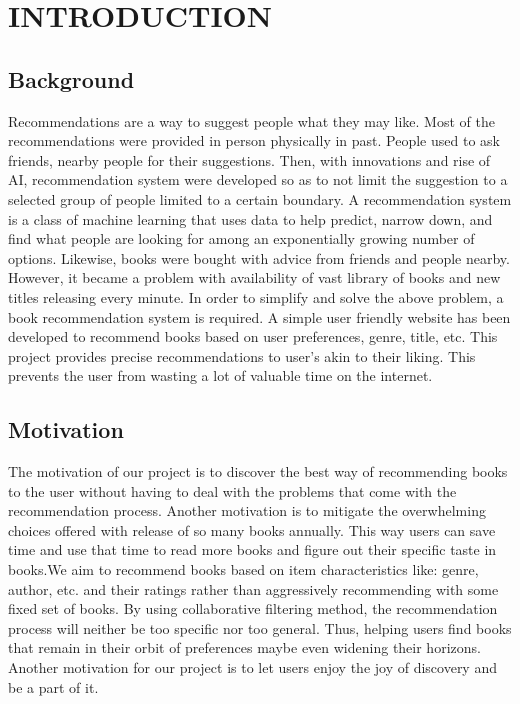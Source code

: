 \chapter{INTRODUCTION}

\section{Background}

 Recommendations are a way to suggest people what they may like. Most of the recommendations were provided in person physically in past. People used to ask friends, nearby people for their suggestions. Then, with innovations and rise of AI, recommendation system were developed so as to not limit the suggestion to a selected group of people limited to a certain boundary. A recommendation system is a class of machine learning that uses data to help predict, narrow down, and find what people are looking for among an exponentially growing number of options. Likewise, books were bought with advice from friends and people nearby. However, it became a problem with availability of vast library of books and new titles releasing every minute. In order to simplify and solve the above problem, a book recommendation system is required. A simple user friendly website has been  developed to recommend books based on user preferences, genre, title, etc. This project provides precise recommendations to user's akin to their liking. This prevents the user from wasting a lot of valuable time on the internet.

\section{Motivation}

The motivation of our project is to discover the best way of recommending books to the user without having to deal with the problems that come with the recommendation process. Another motivation is to mitigate the overwhelming choices offered with release of so many books annually. This way users can save time and use that time to read more books and figure out their specific taste in books.We aim to recommend books based on item characteristics like: genre, author, etc. and their ratings rather than aggressively recommending with some fixed set of books. By using collaborative filtering method, the recommendation process will neither be too specific nor too general. Thus, helping users find books that remain in their orbit of preferences maybe even widening their horizons. Another motivation for our project is to let users enjoy the joy of discovery and be a part of it.

